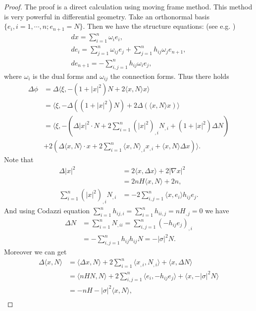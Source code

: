 \documentclass[11pt,reqno]{amsart}
\theoremstyle{definition}
\begin{document}
\begin{proof}
The proof is a direct calculation using moving frame method. This method is very powerful in differential geometry. Take an orthonormal basis $\{e_i,i=1,\cdots,n;e_{n+1}=N \}$. Then we have the structure equations: (see e.g. \cite{CL})
\begin{gather*}
dx=\sum_{i=1}^n \omega_i e_i,\\
de_i=\sum_{j=1}^n \omega_{ij}e_j+\sum_{j=1}^n h_{ij}\omega_j e_{n+1},\\
de_{n+1}=-\sum_{i,j=1}^n h_{ij} \omega_ie_j,
\end{gather*}
where $\omega_i$ is the dual forms and $\omega_{ij}$ the connection forms. Thus there holds
\begin{align}
\Delta \phi&=\Delta \langle \xi, -(1+|x|^2)N+2\langle x,N\rangle x \rangle \nonumber\\
           &={\langle} \xi,-\Delta((1+|x|^2)N)+2\Delta ({\langle} x,N{\rangle} x){\rangle} \nonumber\\
           &={\langle} \xi,-(\Delta |x|^2 \cdot N+2 \sum_{i=1}^n(|x|^2)_{,i} N_{,i}+(1+|x|^2)\Delta N) \nonumber\\
           &+2(\Delta {\langle} x,N{\rangle} \cdot x+2\sum_{i=1}^n{\langle} x,N{\rangle}_{,i}x_{,i}+{\langle} x,N{\rangle} \Delta x){\rangle}.\label{eq6}
\end{align}
Note that
\begin{align*}
\Delta |x|^2&=2{\langle} x,\Delta x{\rangle}+2|\nabla x|^2\\
            &=2nH{\langle} x,N{\rangle}+2n,\\
\sum_{i=1}^n(|x|^2)_{,i}N_{,i}&=-2\sum_{i,j=1}^n{\langle} x,e_i{\rangle} h_{ij}e_j.
\end{align*}
And using Codazzi equation $\sum_{i=1}^nh_{ij,i}=\sum_{i=1}^n h_{ii,j}=nH_{,j}=0$ we have
\begin{align*}
\Delta N&=\sum_{i=1}^n N_{,ii}=\sum_{i,j=1}^n (-h_{ij}e_j)_{,i}\\
        &=-\sum_{i,j=1}^n h_{ij}h_{ij}N=-|\sigma|^2N.
\end{align*}
Moreover we can get
\begin{align*}
\Delta {\langle} x,N{\rangle}&={\langle} \Delta x,N{\rangle}+2\sum_{i=1}^n {\langle} x_{,i},N_{,i}{\rangle} +{\langle} x,\Delta N{\rangle}\\
                 &={\langle} nHN,N{\rangle}+2\sum_{i,j=1}^n{\langle} e_i,-h_{ij}e_j{\rangle}+{\langle} x,-|\sigma|^2 N{\rangle}\\
                 &=-nH-|\sigma|^2{\langle} x,N{\rangle},\\

\end{align*}
\end{proof}
\end{document}
